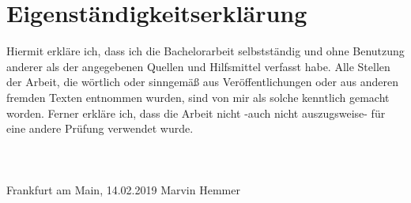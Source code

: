 \documentclass[a4paper,11pt,twoside]{report}
\renewcommand{\,}{,\!} %
\begin{document}
\chapter*{Eigenständigkeitserklärung}
Hiermit erkläre ich, dass ich die Bachelorarbeit selbstständig und ohne Benutzung anderer als der angegebenen Quellen und Hilfsmittel verfasst habe.
Alle Stellen der Arbeit, die wörtlich oder sinngemäß aus Veröffentlichungen oder aus anderen fremden Texten entnommen wurden, sind von mir als solche kenntlich gemacht worden.
Ferner erkläre ich, dass die Arbeit nicht -auch nicht auszugsweise- für eine andere Prüfung verwendet wurde. \\ \\ \\ \\
\hspace*{1cm} Frankfurt am Main, 14.02.2019 
\hspace*{2cm} Marvin Hemmer 
\end{document}
